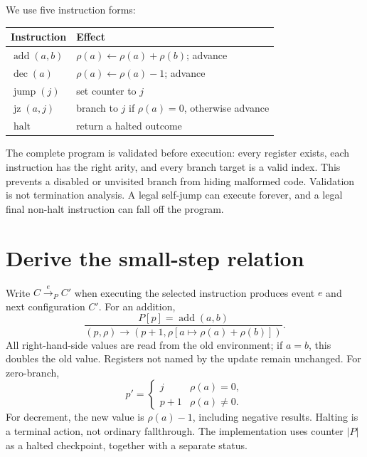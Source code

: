 We use five instruction forms:
\begin{center}
\begin{tabular}{ll}\toprule
Instruction & Effect\\\midrule
$\operatorname{add}(a,b)$ & $\rho(a)\gets\rho(a)+\rho(b)$; advance\\
$\operatorname{dec}(a)$ & $\rho(a)\gets\rho(a)-1$; advance\\
$\operatorname{jump}(j)$ & set counter to $j$\\
$\operatorname{jz}(a,j)$ & branch to $j$ if $\rho(a)=0$, otherwise advance\\
$\operatorname{halt}$ & return a halted outcome\\\bottomrule
\end{tabular}
\end{center}
The complete program is validated before execution: every register exists,
each instruction has the right arity, and every branch target is a valid index.
This prevents a disabled or unvisited branch from hiding malformed code.
Validation is not termination analysis. A legal self-jump can execute forever,
and a legal final non-halt instruction can fall off the program.

\section{Derive the small-step relation}
Write $C\xrightarrow{e}_P C'$ when executing the selected instruction produces
event $e$ and next configuration $C'$. For an addition,
\begin{equation}
 \frac{P[p]=\operatorname{add}(a,b)}
 {(p,\rho)\longrightarrow
 (p+1,\rho[a\mapsto\rho(a)+\rho(b)])}.
 \label{eq:addstep}
\end{equation}
All right-hand-side values are read from the old environment; if $a=b$, this
doubles the old value. Registers not named by the update remain unchanged.
For zero-branch,
\begin{equation}
 p'=\begin{cases}j&\rho(a)=0,\\p+1&\rho(a)\ne0.\end{cases}
 \label{eq:branch}
\end{equation}
For decrement, the new value is $\rho(a)-1$, including negative results.
Halting is a terminal action, not ordinary fallthrough. The implementation
uses counter $|P|$ as a halted checkpoint, together with a separate status.

